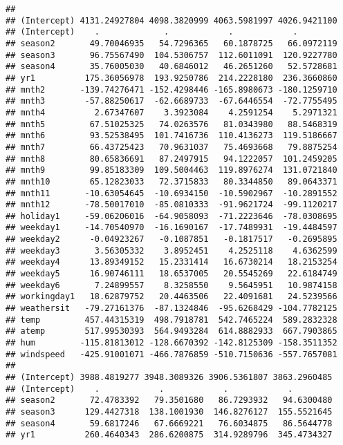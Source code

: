 \documentclass[]{article}
\begin{document}
\begin{verbatim}
##                                                                 
## (Intercept) 4131.24927804 4098.3820999 4063.5981997 4026.9421100
## (Intercept)    .             .            .            .        
## season2       49.70046935   54.7296365   60.1878725   66.0972119
## season3       96.75567490  104.5306757  112.6011091  120.9227780
## season4       35.76005030   40.6846012   46.2651260   52.5728681
## yr1          175.36056978  193.9250786  214.2228180  236.3660860
## mnth2       -139.74276471 -152.4298446 -165.8980673 -180.1259710
## mnth3        -57.88250617  -62.6689733  -67.6446554  -72.7755495
## mnth4          2.67347607    3.3923084    4.2591254    5.2971321
## mnth5         67.51025325   74.0263576   81.0343980   88.5468319
## mnth6         93.52538495  101.7416736  110.4136273  119.5186667
## mnth7         66.43725423   70.9631037   75.4693668   79.8875254
## mnth8         80.65836691   87.2497915   94.1222057  101.2459205
## mnth9         99.85183309  109.5004463  119.8976274  131.0721840
## mnth10        65.12823033   72.3715833   80.3344850   89.0643371
## mnth11       -10.63054645  -10.6934150  -10.5902967  -10.2891552
## mnth12       -78.50017010  -85.0810333  -91.9621724  -99.1120217
## holiday1     -59.06206016  -64.9058093  -71.2223646  -78.0308695
## weekday1     -14.70540970  -16.1690167  -17.7489931  -19.4484597
## weekday2      -0.04923267   -0.1087851   -0.1817517   -0.2695895
## weekday3       3.56305332    3.8952451    4.2525118    4.6362599
## weekday4      13.89349152   15.2331414   16.6730214   18.2153254
## weekday5      16.90746111   18.6537005   20.5545269   22.6184749
## weekday6       7.24899557    8.3258550    9.5645951   10.9874158
## workingday1   18.62879752   20.4463506   22.4091681   24.5239566
## weathersit   -79.27161376  -87.1324846  -95.6268429 -104.7782125
## temp         457.44315319  498.7918781  542.7465224  589.2832328
## atemp        517.99530393  564.9493284  614.8882933  667.7903865
## hum         -115.81813012 -128.6670392 -142.8125309 -158.3511352
## windspeed   -425.91001071 -466.7876859 -510.7150636 -557.7657081
##                                                                
## (Intercept) 3988.4819277 3948.3089326 3906.5361807 3863.2960485
## (Intercept)    .            .            .            .        
## season2       72.4783392   79.3501680   86.7293932   94.6300480
## season3      129.4427318  138.1001930  146.8276127  155.5521645
## season4       59.6817246   67.6669221   76.6034875   86.5644778
## yr1          260.4640343  286.6200875  314.9289796  345.4734327

\end{verbatim}
\end{document}
